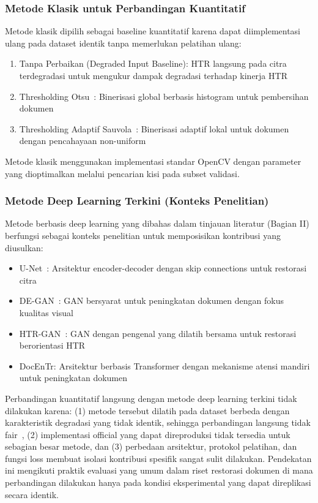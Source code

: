 \documentclass[journal]{IEEEtran}
\begin{document}
\subsubsection{Metode Klasik untuk Perbandingan Kuantitatif}

Metode klasik dipilih sebagai baseline kuantitatif karena dapat diimplementasi ulang pada dataset identik tanpa memerlukan pelatihan ulang:

\begin{enumerate}
    \item Tanpa Perbaikan (Degraded Input Baseline): HTR langsung pada citra terdegradasi untuk mengukur dampak degradasi terhadap kinerja HTR
    \item Thresholding Otsu~\cite{otsu1979threshold}: Binerisasi global berbasis histogram untuk pembersihan dokumen
    \item Thresholding Adaptif Sauvola~\cite{sauvola2000adaptive}: Binerisasi adaptif lokal untuk dokumen dengan pencahayaan non-uniform
\end{enumerate}

Metode klasik menggunakan implementasi standar OpenCV dengan parameter yang dioptimalkan melalui pencarian kisi pada subset validasi.

\subsubsection{Metode Deep Learning Terkini (Konteks Penelitian)}

Metode berbasis deep learning yang dibahas dalam tinjauan literatur (Bagian II) berfungsi sebagai konteks penelitian untuk memposisikan kontribusi yang diusulkan:

\begin{itemize}
    \item U-Net~\cite{ronneberger2015unet}: Arsitektur encoder-decoder dengan skip connections untuk restorasi citra
    \item DE-GAN~\cite{souibgui2020degan}: GAN bersyarat untuk peningkatan dokumen dengan fokus kualitas visual
    \item HTR-GAN~\cite{souibgui2021enhance}: GAN dengan pengenal yang dilatih bersama untuk restorasi berorientasi HTR
    \item DocEnTr: Arsitektur berbasis Transformer dengan mekanisme atensi mandiri untuk peningkatan dokumen
\end{itemize}

Perbandingan kuantitatif langsung dengan metode deep learning terkini tidak dilakukan karena: (1) metode tersebut dilatih pada dataset berbeda dengan karakteristik degradasi yang tidak identik, sehingga perbandingan langsung tidak fair~\cite{tensmeyer2017document}, (2) implementasi official yang dapat direproduksi tidak tersedia untuk sebagian besar metode, dan (3) perbedaan arsitektur, protokol pelatihan, dan fungsi loss membuat isolasi kontribusi spesifik sangat sulit dilakukan. Pendekatan ini mengikuti praktik evaluasi yang umum dalam riset restorasi dokumen di mana perbandingan dilakukan hanya pada kondisi eksperimental yang dapat direplikasi secara identik.
\end{document}
